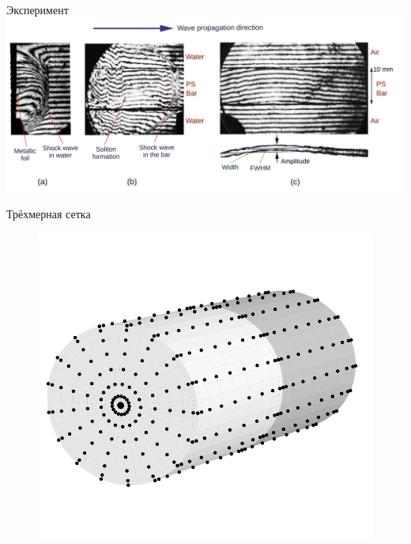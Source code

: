 \documentclass[usenames,dvipsnames]{beamer}
\begin{document}
\begin{frame}{Эксперимент}
\includegraphics[width=1.05\linewidth]{Figures/trio_2_300_2}
\end{frame}


\begin{frame}{Трёхмерная сетка}
\begin{figure}[h!]
		\includegraphics[width=.5\linewidth]{Figures/Grid3D}
\end{figure}
\end{frame}
\end{document}
